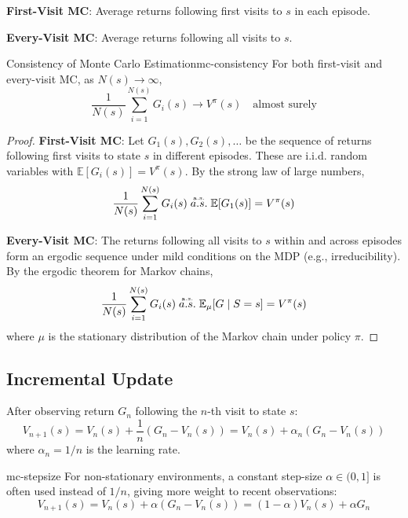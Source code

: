 \documentclass[a4paper, 11pt]{article}
\numberwithin{equation}{section}
\theoremstyle{plain}
\theoremstyle{definition}
\newcommand{\E}{{\mathbb E}}
\newcommand{\1}{{\mathbbm 1}}
\begin{document}
	\textbf{First-Visit MC}: Average returns following first visits to $s$ in each episode.
	
	\textbf{Every-Visit MC}: Average returns following all visits to $s$.
	
	\begin{ftheo}{Consistency of Monte Carlo Estimation}{mc-consistency}
		For both first-visit and every-visit MC, as $N(s) \to \infty$,
		\begin{equation}
			\frac{1}{N(s)} \sum_{i=1}^{N(s)} G_i(s) \to V^{\pi}(s) \quad \text{almost surely}
		\end{equation}
	\end{ftheo}
	
	\begin{proof}
		\textbf{First-Visit MC}: Let $G_1(s), G_2(s), \ldots$ be the sequence of returns following first visits to state $s$ in different episodes. These are i.i.d. random variables with $\E[G_i(s)] = V^{\pi}(s)$. By the strong law of large numbers,
		\begin{equation*}
			\frac{1}{N(s)} \sum_{i=1}^{N(s)} G_i(s) \tos[a.s.] \E[G_1(s)] = V^{\pi}(s)
		\end{equation*}
		
		\textbf{Every-Visit MC}: The returns following all visits to $s$ within and across episodes form an ergodic sequence under mild conditions on the MDP (e.g., irreducibility). By the ergodic theorem for Markov chains,
		\begin{equation*}
			\frac{1}{N(s)} \sum_{i=1}^{N(s)} G_i(s) \tos[a.s.] \E_{\mu}[G\;|\; S = s] = V^{\pi}(s)
		\end{equation*}
		where $\mu$ is the stationary distribution of the Markov chain under policy $\pi$.
	\end{proof}
	
	\subsection{Incremental Update}
	
	After observing return $G_n$ following the $n$-th visit to state $s$:
	\begin{equation}\label{mc-incremental}
		V_{n+1}(s) = V_n(s) + \frac{1}{n}(G_n - V_n(s)) = V_n(s) + \alpha_n(G_n - V_n(s))
	\end{equation}
	where $\alpha_n = 1/n$ is the learning rate.
	
	\begin{frema}{}{mc-stepsize}
		For non-stationary environments, a constant step-size $\alpha \in (0, 1]$ is often used instead of $1/n$, giving more weight to recent observations:
		\begin{equation}
			V_{n+1}(s) = V_n(s) + \alpha(G_n - V_n(s)) = (1-\alpha)V_n(s) + \alpha G_n
		\end{equation}
	\end{frema}
	
\end{document}
